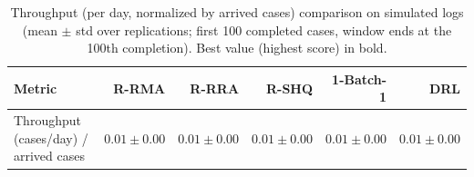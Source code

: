 \begin{table}[htbp]
\centering
\scriptsize
\caption{Throughput (per day, normalized by arrived cases) comparison on simulated logs (mean $\pm$ std over replications; first 100 completed cases, window ends at the 100th completion). Best value (highest score) in bold.}
\label{tab:throughput-perday-arrived-first100}
\begin{tabular}{l r r r r r}
\toprule
\textbf{Metric} & \textbf{R-RMA} & \textbf{R-RRA} & \textbf{R-SHQ} & \textbf{1-Batch-1} & \textbf{DRL} \\
\midrule
Throughput (cases/day) / arrived cases & $0.01 \pm 0.00$ & $\mathbf{0.01 \pm 0.00}$ & $0.01 \pm 0.00$ & $0.01 \pm 0.00$ & $0.01 \pm 0.00$ \\
\bottomrule
\end{tabular}
\end{table}
